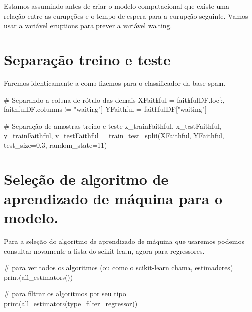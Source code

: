 \documentclass[
  letterpaper,
  DIV=11,
  numbers=noendperiod]{scrreprt}
\newenvironment{Shaded}{\begin{snugshade}}{\end{snugshade}}
\newcommand{\BuiltInTok}[1]{\textcolor[rgb]{0.00,0.23,0.31}{#1}}
\newcommand{\CommentTok}[1]{\textcolor[rgb]{0.37,0.37,0.37}{#1}}
\newcommand{\DecValTok}[1]{\textcolor[rgb]{0.68,0.00,0.00}{#1}}
\newcommand{\FloatTok}[1]{\textcolor[rgb]{0.68,0.00,0.00}{#1}}
\newcommand{\NormalTok}[1]{\textcolor[rgb]{0.00,0.23,0.31}{#1}}
\newcommand{\OperatorTok}[1]{\textcolor[rgb]{0.37,0.37,0.37}{#1}}
\newcommand{\StringTok}[1]{\textcolor[rgb]{0.13,0.47,0.30}{#1}}
\begin{document}
Estamos assumindo antes de criar o modelo computacional que existe uma
relação entre as eurupções e o tempo de espera para a eurupção seguinte.
Vamos usar a variável eruptions para prever a variável waiting.

\hypertarget{separauxe7uxe3o-treino-e-teste-1}{%
\section{Separação treino e
teste}\label{separauxe7uxe3o-treino-e-teste-1}}

Faremos identicamente a como fizemos para o classificador da base spam.

\begin{Shaded}
\begin{Highlighting}[]
\CommentTok{\# Separando a coluna de rótulo das demais}
\NormalTok{XFaithful }\OperatorTok{=}\NormalTok{ faithfulDF.loc[:, faithfulDF.columns }\OperatorTok{!=} \StringTok{"waiting"}\NormalTok{]}
\NormalTok{YFaithful }\OperatorTok{=}\NormalTok{ faithfulDF[}\StringTok{"waiting"}\NormalTok{]}

\CommentTok{\# Separação de amostras treino e teste}
\NormalTok{x\_trainFaithful, x\_testFaithful, y\_trainFaithful, y\_testFaithful }\OperatorTok{=}\NormalTok{ train\_test\_split(XFaithful, YFaithful, test\_size}\OperatorTok{=}\FloatTok{0.3}\NormalTok{, random\_state}\OperatorTok{=}\DecValTok{11}\NormalTok{)}
\end{Highlighting}
\end{Shaded}

\hypertarget{seleuxe7uxe3o-de-algoritmo-de-aprendizado-de-muxe1quina-para-o-modelo.}{%
\section{Seleção de algoritmo de aprendizado de máquina para o
modelo.}\label{seleuxe7uxe3o-de-algoritmo-de-aprendizado-de-muxe1quina-para-o-modelo.}}

Para a seleção do algoritmo de aprendizado de máquina que usaremos
podemos consultar novamente a lista do scikit-learn, agora para
regressores.

\begin{Shaded}
\begin{Highlighting}[]
\CommentTok{\# para ver todos os algoritmos (ou como o scikit{-}learn chama, estimadores)}
\BuiltInTok{print}\NormalTok{(all\_estimators())}

\CommentTok{\# para filtrar os algoritmos por seu tipo }
\BuiltInTok{print}\NormalTok{(all\_estimators(type\_filter}\OperatorTok{=}\StringTok{\textquotesingle{}regressor\textquotesingle{}}\NormalTok{)) }
\end{Highlighting}
\end{Shaded}
\end{document}
